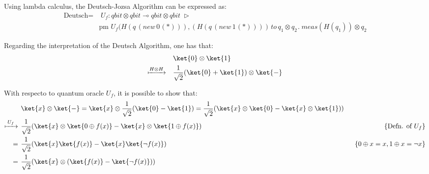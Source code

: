   Using lambda calculus, the Deutsch-Jozsa Algorithm can be expressed as:
  \begin{align*}
  \text{Deutsch} = & \hspace{3pt} U_{f}: \textit{qbit} \otimes \textit{qbit} \multimap \textit{qbit} \otimes \textit{qbit} \hspace{3pt} \triangleright \hspace{3pt}  \\ 
  & \text{pm} \hspace{4pt}  U_{f}(H(q  \hspace{2pt}   ( \textit{new}   \hspace{2pt}  0 \hspace{1pt}(*))),(H(q  \hspace{2pt}   ( \textit{new}   \hspace{2pt}  1 \hspace{1pt}(*)))) \hspace{2pt}  \textit{to} \hspace{2pt} q_{1} \otimes q_{2} \hspace{1pt}. \hspace{3pt} \textit{meas} (H( q_{1})) \otimes q_{2}
   \end{align*}

  
  Regarding the interpretation of the Deutsch Algorithm, one has that:
  \begin{equation}
  \begin{split}
   & \ket{0} \otimes \ket{1} \\
   \xmapsto{ H \otimes H} \quad & \frac{1}{\sqrt{2}}(\ket{0} + \ket{1}) \otimes \ket{-} \\
  \end{split}
  \end{equation}
  
  With respecto to  quantum oracle $U_f$, it is possible to show that:
  \begin{equation}
  \begin{split}
    &\ket{x} \otimes \ket{-} =   \ket{x} \otimes \frac{1}{\sqrt{2}}(\ket{0} - \ket{1}) = \frac{1}{\sqrt{2}}(\ket{x} \otimes \ket{0} - \ket{x} \otimes \ket{1})) \\
    \xmapsto{ \hspace{2pt} U_{f} \hspace{2pt}} \hspace{4pt} &  \frac{1}{\sqrt{2}}(\ket{x} \otimes \ket{0 \oplus f(x)} - \ket{x} \otimes \ket{1 \oplus f(x)}) &\hspace{50pt} \{\text{Defn. of } U_f\} \\
    = \hspace{4pt}  & \frac{1}{\sqrt{2}}(\ket{x} \ket{f(x)} - \ket{x} \ket{\neg f(x)}) & \{0\oplus x=x, 1\oplus x = \neg x\} \\
    = \hspace{4pt}  & \frac{1}{\sqrt{2}}(\ket{x} \otimes (\ket{f(x)}-\ket{\neg f(x)}))
   \end{split}
  \end{equation}
  

